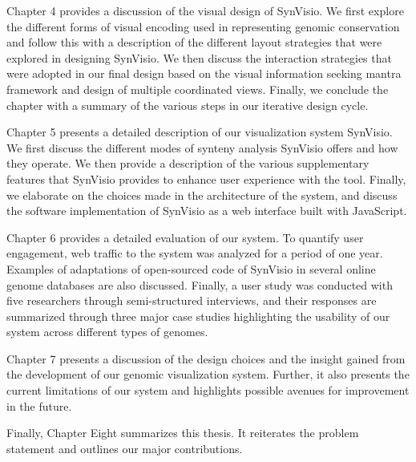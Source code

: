  Chapter 4 provides a discussion of the visual design of SynVisio. We first explore the different forms of visual encoding used in representing genomic conservation and follow this with a description of the different layout strategies that were explored in designing SynVisio. We then discuss the interaction strategies that were adopted in our final design based on the visual information seeking mantra framework and design of multiple coordinated views. Finally, we conclude the chapter with a summary of the various steps in our iterative design cycle.

Chapter 5 presents a detailed description of our visualization system SynVisio. We first discuss the different modes of synteny analysis SynVisio offers and how they operate. We then provide a description of the various supplementary features that SynVisio provides to enhance user experience with the tool. Finally, we elaborate on the choices made in the architecture of the system,
and discuss the software implementation of SynVisio as a web interface built with JavaScript.

Chapter 6 provides a detailed evaluation of our system. To quantify user engagement, web traffic to the system was analyzed for a period of one year. Examples of adaptations of open-sourced code of SynVisio in several online genome databases are also discussed. Finally, a user study was conducted with five researchers through semi-structured interviews, and their responses are summarized through three major case studies highlighting the usability of our system across different types of genomes.

Chapter 7 presents a discussion of the design choices and the insight gained from the development of our genomic visualization system. Further, it also presents the current limitations of our system and highlights possible avenues for improvement in the future.

Finally, Chapter Eight summarizes this thesis. It reiterates the problem statement and outlines our major contributions.